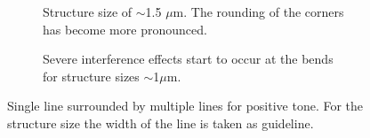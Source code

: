 \begin{figure}[!t]
 \hfill
     \begin{subfigure}[t]{0.24\linewidth}
  	\centering
  	\caption{Structure size of $\sim$1.5 $\mu$m. The rounding of the corners has become more pronounced.}
  	\label{fig:b2d15_q15}
   \end{subfigure}
 \hfill
     \begin{subfigure}[t]{0.24\linewidth}
  	\centering
  	\caption{Severe interference effects start to occur at the bends for structure sizes $\sim$1$\mu$m.}
  	\label{fig:b2d16_q16}
  \end{subfigure}
\caption{Single line surrounded by multiple lines for positive tone. For the structure size the width of the line is taken as guideline.}
 \end{figure}

